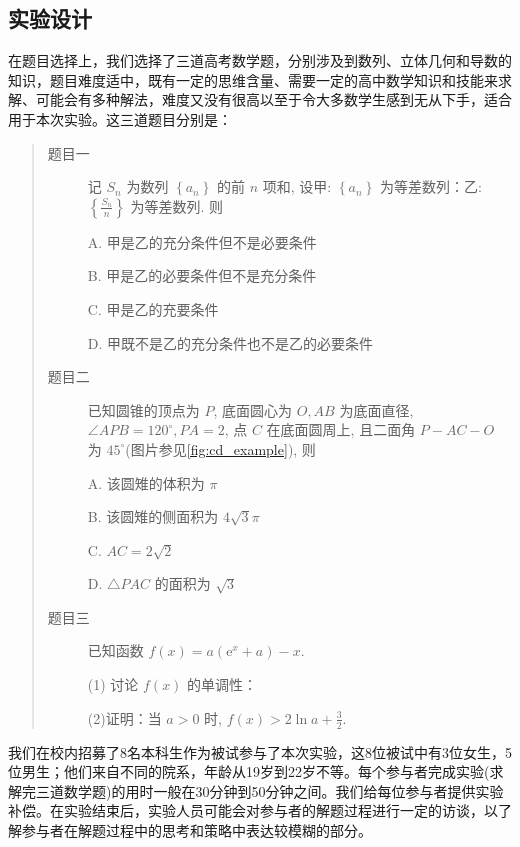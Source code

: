 \subsection{实验设计}
在题目选择上，我们选择了三道高考数学题，分别涉及到数列、立体几何和导数的知识，题目难度适中，既有一定的思维含量、需要一定的高中数学知识和技能来求解、可能会有多种解法，难度又没有很高以至于令大多数学生感到无从下手，适合用于本次实验。这三道题目分别是：

\begin{quote}
    \begin{description}
        \item[题目一] 记 $S_n$ 为数列 $\left\{a_n\right\}$ 的前 $n$ 项和, 设甲: $\left\{a_n\right\}$ 为等差数列：乙: $\left\{\frac{S_n}{n}\right\}$ 为等差数列. 则

        A. 甲是乙的充分条件但不是必要条件

        B. 甲是乙的必要条件但不是充分条件

        C. 甲是乙的充要条件

        D. 甲既不是乙的充分条件也不是乙的必要条件

        \item[题目二] 已知圆锥的顶点为 $P$, 底面圆心为 $O, A B$ 为底面直径, $\angle A P B=120^{\circ}, P A=2$, 点 $C$ 在底面圆周上, 且二面角 $P-A C-O$ 为 $45^{\circ}$(图片参见\ref{fig:cd_example}), 则

        A. 该圆雉的体积为 $\pi$

        B. 该圆雉的侧面积为 $4 \sqrt{3} \pi$

        C. $A C=2 \sqrt{2}$

        D. $\triangle P A C$ 的面积为 $\sqrt{3}$

        \item[题目三] 已知函数 $f(x)=a\left(\mathrm{e}^x+a\right)-x$.

        (1) 讨论 $f(x)$ 的单调性：

        (2)证明：当 $a>0$ 时, $f(x)>2 \ln a+\frac{3}{2}$.
    \end{description}
\end{quote}


我们在校内招募了8名本科生作为被试参与了本次实验，这8位被试中有3位女生，5位男生；他们来自不同的院系，年龄从19岁到22岁不等。每个参与者完成实验(求解完三道数学题)的用时一般在30分钟到50分钟之间。我们给每位参与者提供实验补偿。在实验结束后，实验人员可能会对参与者的解题过程进行一定的访谈，以了解参与者在解题过程中的思考和策略中表达较模糊的部分。

